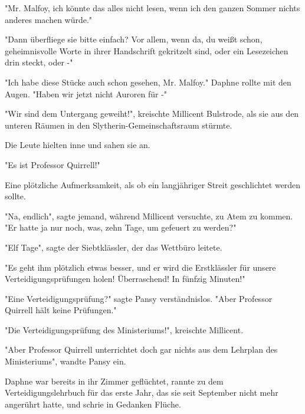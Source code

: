 {"Mr. Malfoy, ich könnte das alles nicht lesen, wenn ich den ganzen Sommer nichts anderes machen würde."

"Dann überfliege sie bitte einfach? Vor allem, wenn da, du weißt schon, geheimnisvolle Worte in ihrer Handschrift gekritzelt sind, oder ein Lesezeichen drin steckt, oder -"

"Ich habe diese Stücke auch schon gesehen, Mr. Malfoy." Daphne rollte mit den Augen. "Haben wir jetzt nicht Auroren für -"

"Wir sind dem Untergang geweiht!", kreischte Millicent Bulstrode, als sie aus den unteren Räumen in den Slytherin-Gemeinschaftsraum stürmte.

Die Leute hielten inne und sahen sie an.

"Es ist Professor Quirrell!"

Eine plötzliche Aufmerksamkeit, als ob ein langjähriger Streit geschlichtet werden sollte.

"Na, endlich", sagte jemand, während Millicent versuchte, zu Atem zu kommen. "Er hatte ja nur noch, was, zehn Tage, um gefeuert zu werden?"

"Elf Tage", sagte der Siebtklässler, der das Wettbüro leitete.

"Es geht ihm plötzlich etwas besser, und er wird die Erstklässler für unsere Verteidigungsprüfungen holen! Überraschend! In fünfzig Minuten!"

"Eine Verteidigungsprüfung?" sagte Pansy verständnislos. "Aber Professor Quirrell hält keine Prüfungen."

"Die Verteidigungsprüfung des Ministeriums!", kreischte Millicent.

"Aber Professor Quirrell unterrichtet doch gar nichts aus dem Lehrplan des Ministeriums", wandte Pansy ein.

Daphne war bereits in ihr Zimmer geflüchtet, rannte zu dem Verteidigungslehrbuch für das erste Jahr, das sie seit September nicht mehr angerührt hatte, und schrie in Gedanken Flüche.

}
